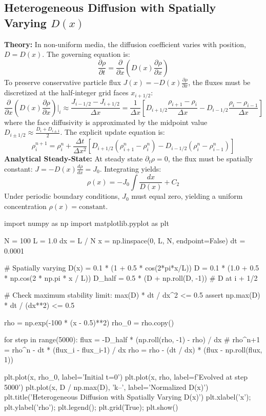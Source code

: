 \documentclass{article}
\begin{document}
\subsection{Heterogeneous Diffusion with Spatially Varying \texorpdfstring{$D(x)$}{D(x)}}
\textbf{Theory:} In non-uniform media, the diffusion coefficient varies with position, $D = D(x)$. The governing equation is:
$$\frac{\partial \rho}{\partial t} = \frac{\partial}{\partial x} \left( D(x) \frac{\partial \rho}{\partial x} \right)$$
To preserve conservative particle flux $J(x) = -D(x) \frac{\partial \rho}{\partial x}$, the fluxes must be discretized at the half-integer grid faces $x_{i+1/2}$:
$$\frac{\partial}{\partial x}\left( D(x) \frac{\partial \rho}{\partial x} \right)\bigg|_i \approx \frac{J_{i-1/2} - J_{i+1/2}}{\Delta x} = \frac{1}{\Delta x} \left[ D_{i+1/2} \frac{\rho_{i+1} - \rho_i}{\Delta x} - D_{i-1/2} \frac{\rho_i - \rho_{i-1}}{\Delta x} \right]$$
where the face diffusivity is approximated by the midpoint value $D_{i \pm 1/2} \approx \frac{D_i + D_{i \pm 1}}{2}$.
The explicit update equation is:
$$\rho_i^{n+1} = \rho_i^n + \frac{\Delta t}{\Delta x^2} \left[ D_{i+1/2}(\rho_{i+1}^n - \rho_i^n) - D_{i-1/2}(\rho_i^n - \rho_{i-1}^n) \right]$$
\textbf{Analytical Steady-State:} At steady state $\partial_t \rho = 0$, the flux must be spatially constant: $J = -D(x)\frac{d\rho}{dx} = J_0$. Integrating yields:
$$\rho(x) = -J_0 \int \frac{dx}{D(x)} + C_2$$
Under periodic boundary conditions, $J_0$ must equal zero, yielding a uniform concentration $\rho(x) = \text{constant}$.

\begin{jupytercode}
import numpy as np
import matplotlib.pyplot as plt

N = 100
L = 1.0
dx = L / N
x = np.linspace(0, L, N, endpoint=False)
dt = 0.0001

# Spatially varying D(x) = 0.1 * (1 + 0.5 * cos(2*pi*x/L))
D = 0.1 * (1.0 + 0.5 * np.cos(2 * np.pi * x / L))
D_half = 0.5 * (D + np.roll(D, -1)) # D at i + 1/2

# Check maximum stability limit: max(D) * dt / dx^2 <= 0.5
assert np.max(D) * dt / (dx**2) <= 0.5

rho = np.exp(-100 * (x - 0.5)**2)
rho_0 = rho.copy()

for step in range(5000):
    flux = -D_half * (np.roll(rho, -1) - rho) / dx
    # rho^{n+1} = rho^n - dt * (flux_i - flux_{i-1}) / dx
    rho = rho - (dt / dx) * (flux - np.roll(flux, 1))

plt.plot(x, rho_0, label='Initial t=0')
plt.plot(x, rho, label=f'Evolved at step 5000')
plt.plot(x, D / np.max(D), 'k--', label='Normalized D(x)')
plt.title('Heterogeneous Diffusion with Spatially Varying D(x)')
plt.xlabel('x'); plt.ylabel('rho'); plt.legend(); plt.grid(True); plt.show()
\end{jupytercode}
\newpage
\end{document}
